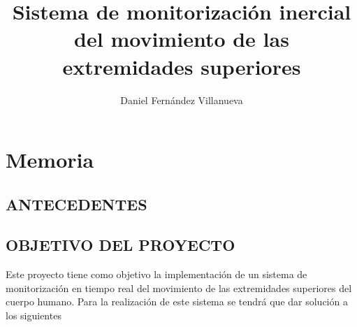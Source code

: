 \documentclass[10pt, a4paper]{report}
\author{Daniel Fernández Villanueva}
\title{\huge Sistema de monitorización inercial del movimiento de las extremidades superiores}
\begin{document}
\maketitle

\tableofcontents

\listoffigures

\listoftables


\part{Memoria}

\pagestyle{headings}



\chapter{ANTECEDENTES}



\chapter{OBJETIVO DEL PROYECTO}

Este proyecto tiene como objetivo la implementación de un sistema de monitorización en tiempo real del movimiento de las extremidades superiores del cuerpo humano. Para la realización de este sistema se tendrá que dar solución a los siguientes
\end{document}
